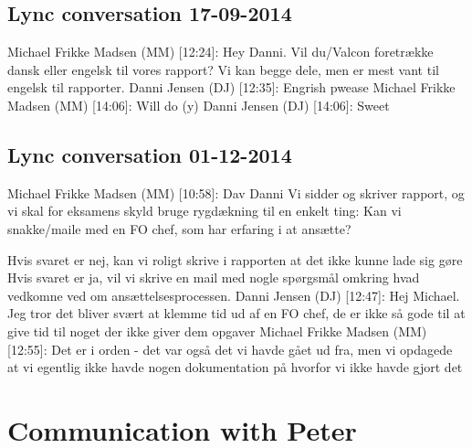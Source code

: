 \begin{linenumbers*}
\subsection{Lync conversation 17-09-2014}
Michael Frikke Madsen (MM) [12:24]: 
Hey Danni. Vil du/Valcon foretrække dansk eller engelsk til vores rapport?
Vi kan begge dele, men er mest vant til engelsk til rapporter. \newline
Danni Jensen (DJ) [12:35]: 
Engrish pwease \newline
Michael Frikke Madsen (MM) [14:06]: 
Will do (y) \newline
Danni Jensen (DJ) [14:06]: 
Sweet

\subsection{Lync conversation 01-12-2014}
Michael Frikke Madsen (MM) [10:58]: 
Dav Danni
Vi sidder og skriver rapport, og vi skal for eksamens skyld bruge rygdækning til en enkelt ting:
Kan vi snakke/maile med en FO chef, som har erfaring i at ansætte?

Hvis svaret er nej, kan vi roligt skrive i rapporten at det ikke kunne lade sig gøre
Hvis svaret er ja, vil vi skrive en mail med nogle spørgsmål omkring hvad vedkomne ved om ansættelsesprocessen. \newline
Danni Jensen (DJ) [12:47]: 
Hej Michael. Jeg tror det bliver svært at klemme tid ud af en FO chef, de er ikke så gode til at give tid til noget der ikke giver dem opgaver \newline
{}
Michael Frikke Madsen (MM) [12:55]: 
Det er i orden - det var også det vi havde gået ud fra, men vi opdagede at vi egentlig ikke havde nogen dokumentation på hvorfor vi ikke havde gjort det 

\section{Communication with Peter}


\end{linenumbers*}
